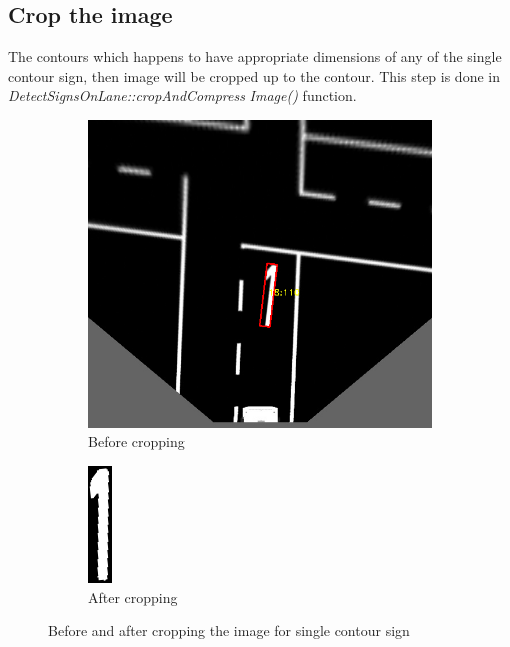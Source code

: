 \subsection{Crop the image}
The contours which happens to have appropriate dimensions of any of the single contour sign, then image will be cropped up to the contour. This step is done in \emph{DetectSignsOnLane::cropAndCompress} \newline \emph{Image()} function.
\begin{figure}[h!]
\begin{subfigure}{0.5\textwidth}
\includegraphics[scale=0.5]{images/BeforeCropping.png} 
\caption{Before cropping}
\end{subfigure}
\begin{subfigure}{0.5\textwidth}
\centering
\includegraphics[scale=2.5]{images/AfterCropping.png} 
\caption{After cropping}
\end{subfigure}
\caption{Before and after cropping the image for single contour sign}
\label{fig:BeforeAfterCropSingleContour}
\end{figure}

